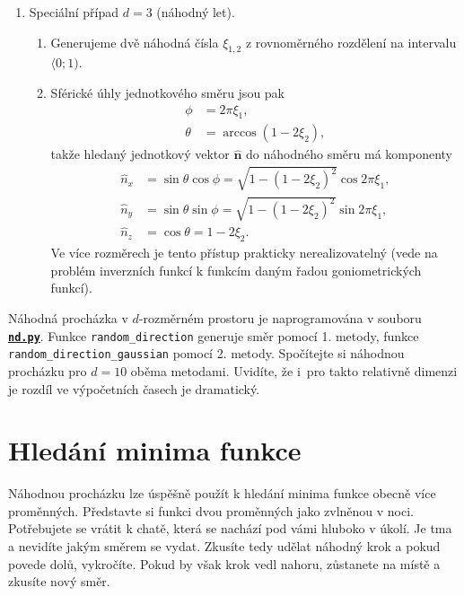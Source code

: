 \documentclass[a4paper,11pt,twoside]{article}
\def\vector#1{\boldsymbol{#1}}			%
\def\code#1{\textnormal{\texttt{#1}}}
\def\ghfile#1#2{\textnormal{\textbf{\texttt{\href{https://github.com/PavelStransky/PCInPhysics/blob/main/#1#2}{#2}}}}}
\theoremstyle{red}
\theoremstyle{green}
\begin{document}
\begin{solution}
\begin{enumerate}
            \item Speciální případ $d=3$ (náhodný let).
                \begin{enumerate}
                    \item Generujeme dvě náhodná čísla $\xi_{1,2}$ z rovnoměrného rozdělení na intervalu $\langle0;1)$.
                    \item Sférické úhly jednotkového směru jsou pak
                        \begin{align}
                            \phi&=2\pi\xi_{1},\nonumber\\
                            \theta&=\arccos\left(1-2\xi_{2}\right),
                        \end{align}
                        takže hledaný jednotkový vektor $\vector{\hat{n}}$ do náhodného směru má komponenty
                        \begin{align}
                            \hat{n}_{x}
                                &=\sin\theta\cos\phi
                                =\sqrt{1-\left(1-2\xi_{2}\right)^{2}}\cos2\pi\xi_{1},\nonumber\\
                            \hat{n}_{y}
                                &=\sin\theta\sin\phi
                                =\sqrt{1-\left(1-2\xi_{2}\right)^{2}}\sin2\pi\xi_{1},\\
                            \hat{n}_{z}
                                &=\cos\theta
                                =1-2\xi_{2}.\nonumber
                        \end{align}
                        Ve více rozměrech je tento přístup prakticky nerealizovatelný (vede na problém inverzních funkcí k funkcím daným řadou goniometrických funkcí).
                \end{enumerate}
            \end{enumerate}

            Náhodná procházka v $d$-rozměrném prostoru je naprogramována v souboru \ghfile{python/randomwalk/}{nd.py}.
            Funkce \code{ran\-dom_direction} generuje směr pomocí 1. metody, funkce \code{random_direction_gaussian} pomocí 2. metody.
            Spočítejte si náhodnou procházku pro $d=10$ oběma metodami.
            Uvidíte, že i~pro takto relativně  dimenzi je rozdíl ve výpočetních časech je dramatický.
    \end{solution}



\section{Hledání minima funkce}
    Náhodnou procházku lze úspěšně použít k hledání minima funkce obecně více proměnných.
    Představte si funkci dvou proměnných jako zvlněnou  v noci.
    Potřebujete se vrátit k chatě, která se nachází pod vámi hluboko v úkolí.
    Je tma a nevidíte jakým směrem se vydat.
    Zkusíte tedy udělat náhodný krok a pokud povede dolů, vykročíte.
    Pokud by však krok vedl nahoru, zůstanete na místě a zkusíte nový směr.
\end{document}
